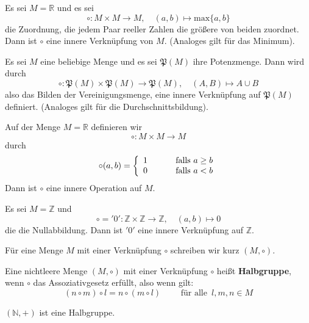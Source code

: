 \begin{beispiel}\label{gruppe_operation_max} Es sei $M = \mathbb R$ und es sei
  	$$ \circ : M \times M \longrightarrow M, \quad (a,b) \longmapsto \textrm{max}\{a,b\} $$
die Zuordnung, die jedem Paar reeller Zahlen die größere von beiden zuordnet. Dann ist
$\circ$ eine innere Verknüpfung von $M$. (Analoges gilt für das Minimum).
\end{beispiel}

\begin{beispiel}\label{gruppe_operation_potenzm} Es sei $M$ eine beliebige Menge und es sei 
$\mathfrak{P}(M)$ ihre Potenzmenge. Dann wird durch
  	$$ \circ : \mathfrak{P}(M) \times \mathfrak{P}(M) \longrightarrow \mathfrak{P}(M), \quad
    	(A,B) \longmapsto A \cup B $$
also das Bilden der Vereinigungsmenge, eine innere Verknüpfung auf $\mathfrak{P}(M)$ definiert.
(Analoges gilt für die Durchschnittsbildung).
\end{beispiel}

\begin{beispiel}\label{gruppe_operation_non_ass} Auf der Menge $M = \mathbb R$ definieren wir
  	$$ \circ : M \times M \longrightarrow M $$
durch 
  	$$ \circ(a,b) = \left\{ \begin{array}{l c l} 1 & \quad & \textrm{ falls } a \geq b \\
	0 & & \textrm{ falls } a < b \end{array} \right. $$
Dann ist $\circ$ eine innere Operation auf $M$.
\end{beispiel}

\begin{beispiel}\label{gruppe_z_null} Es sei $M = \mathbb Z$ und 
  	$$ \circ = '0': \mathbb Z \times \mathbb Z \longrightarrow \mathbb Z, \quad (a,b) \longmapsto 0 $$
die die Nullabbildung. Dann ist $'0'$ eine innere Verknüpfung auf $\mathbb Z$.
\end{beispiel}

Für eine Menge $M$ mit einer Verknüpfung $\circ$ schreiben wir kurz $(M, \circ)$.

\begin{definition} Eine nichtleere Menge $(M, \circ)$ mit einer Verknüpfung $ \circ$ heißt 
\textbf{Halbgruppe}, 
wenn $\circ$ das Assoziativgesetz erfüllt, also wenn gilt:
  	$$ (n \circ m) \circ l = n \circ (m \circ l) \qquad \textrm{ für alle } \, l, m, n \in M $$ 
\end{definition}

\begin{beispiel} $(\mathbb N, +)$ ist eine Halbgruppe. \end{beispiel}

